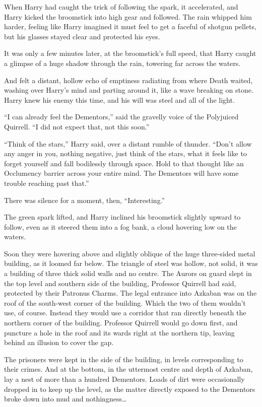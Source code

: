 When Harry had caught the trick of following the spark, it accelerated, and Harry kicked the broomstick into high gear and followed. The rain whipped him harder, feeling like Harry imagined it must feel to get a faceful of shotgun pellets, but his glasses stayed clear and protected his eyes.

It was only a few minutes later, at the broomstick’s full speed, that Harry caught a glimpse of a huge shadow through the rain, towering far across the waters.

And felt a distant, hollow echo of emptiness radiating from where Death waited, washing over Harry’s mind and parting around it, like a wave breaking on stone. Harry knew his enemy this time, and his will was steel and all of the light.

“I can already feel the Dementors,” said the gravelly voice of the Polyjuiced Quirrell.
“I did not expect that, not this soon.”

“Think of the stars,” Harry said, over a distant rumble of thunder.
“Don’t allow any anger in you, nothing negative, just think of the stars, what it feels like to forget yourself and fall bodilessly through space. Hold to that thought like an Occlumency barrier across your entire mind. The Dementors will have some trouble reaching past that.”

There was silence for a moment, then,
“Interesting.”

The green spark lifted, and Harry inclined his broomstick slightly upward to follow, even as it steered them into a fog bank, a cloud hovering low on the waters.

Soon they were hovering above and slightly oblique of the huge three-sided metal building, as it loomed far below. The triangle of steel was hollow, not solid, it was a building of three thick solid walls and no centre. The Aurors on guard slept in the top level and southern side of the building, Professor Quirrell had said, protected by their Patronus Charms. The legal entrance into Azkaban was on the roof of the south-west corner of the building. Which the two of them wouldn’t use, of course. Instead they would use a corridor that ran directly beneath the northern corner of the building. Professor Quirrell would go down first, and puncture a hole in the roof and its wards right at the northern tip, leaving behind an illusion to cover the gap.

The prisoners were kept in the side of the building, in levels corresponding to their crimes. And at the bottom, in the uttermost centre and depth of Azkaban, lay a nest of more than a hundred Dementors. Loads of dirt were occasionally dropped in to keep up the level, as the matter directly exposed to the Dementors broke down into mud and nothingness…

